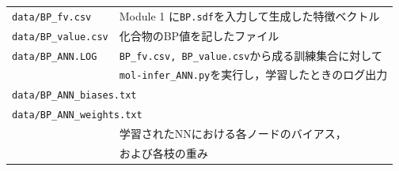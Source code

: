 \documentclass[11pt,dvipdfmx,twoside]{jarticle}
\begin{document}
\begin{table}[h!]
\begin{tabular}{lcll}
  \multicolumn{2}{l}{\tt data/BP\_fv.csv} & \multicolumn{2}{l}{Module 1 に{\tt BP.sdf}を入力して生成した特徴ベクトル}\\
  \multicolumn{2}{l}{\tt data/BP\_value.csv} & \multicolumn{2}{l}{化合物のBP値を記したファイル}\\
  \multicolumn{2}{l}{\tt data/BP\_ANN.LOG} & \multicolumn{2}{l}{{\tt BP\_fv.csv, BP\_value.csv}から成る訓練集合に対して}\\
  &&\multicolumn{2}{l}{{\tt mol-infer\_ANN.py}を実行し，学習したときのログ出力}\\
  \multicolumn{4}{l}{\tt data/BP\_ANN\_biases.txt} \\
  \multicolumn{4}{l}{\tt data/BP\_ANN\_weights.txt} \\
  &&\multicolumn{2}{l}{学習されたNNにおける各ノードのバイアス，}\\
  &&\multicolumn{2}{l}{および各枝の重み}\\
  \hline
  \end{tabular}
\end{table}

\newpage
\end{document}
